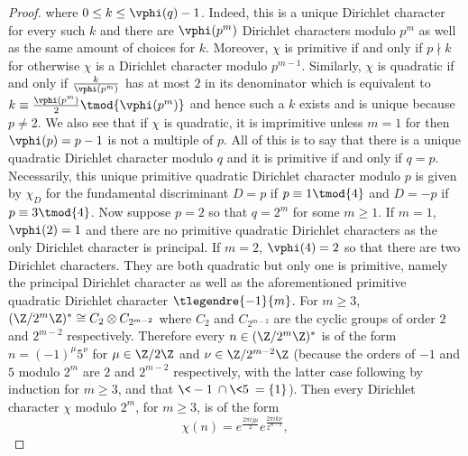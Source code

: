 \begin{proof}
        where $0 \le k \le \vphi(q)-1$. Indeed, this is a unique Dirichlet character for every such $k$ and there are $\vphi(p^{m})$ Dirichlet characters modulo $p^{m}$ as well as the same amount of choices for $k$. Moreover, $\chi$ is primitive if and only if $p \nmid k$ for otherwise $\chi$ is a Dirichlet character modulo $p^{m-1}$. Similarly, $\chi$ is quadratic if and only if $\frac{k}{\vphi(p^{m})}$ has at most $2$ in its denominator which is equivalent to $k \equiv \frac{\vphi(p^{m})}{2} \tmod{\vphi(p^{m})}$ and hence such a $k$ exists and is unique because $p \neq 2$. We also see that if $\chi$ is quadratic, it is imprimitive unless $m = 1$ for then $\vphi(p) = p-1$ is not a multiple of $p$. All of this is to say that there is a unique quadratic Dirichlet character modulo $q$ and it is primitive if and only if $q = p$. Necessarily, this unique primitive quadratic Dirichlet character modulo $p$ is given by $\chi_{D}$ for the fundamental discriminant $D = p$ if $p \equiv 1 \tmod{4}$ and $D = -p$ if $p \equiv 3 \tmod{4}$. Now suppose $p = 2$ so that $q = 2^{m}$ for some $m \ge 1$. If $m = 1$, $\vphi(2) = 1$ and there are no primitive quadratic Dirichlet characters as the only Dirichlet character is principal. If $m = 2$, $\vphi(4) = 2$ so that there are two Dirichlet characters. They are both quadratic but only one is primitive, namely the principal Dirichlet character as well as the aforementioned primitive quadratic Dirichlet character $\tlegendre{-1}{m}$. For $m \ge 3$, $(\Z/2^{m}\Z)^{\ast} \cong C_{2} \otimes C_{2^{m-2}}$ where $C_{2}$ and $C_{2^{m-2}}$ are the cyclic groups of order $2$ and $2^{m-2}$ respectively. Therefore every $n \in (\Z/2^{m}\Z)^{\ast}$ is of the form $n = (-1)^{\mu}5^{\nu}$ for $\mu \in \Z/2\Z$ and $\nu \in \Z/2^{m-2}\Z$ (because the orders of $-1$ and $5$ modulo $2^{m}$ are $2$ and $2^{m-2}$ respectively, with the latter case following by induction for $m \ge 3$, and that $\<-1\> \cap \<5\> = \{1\}$). Then every Dirichlet character $\chi$ modulo $2^{m}$, for $m \ge 3$, is of the form
        \[
          \chi(n) = e^{\frac{2\pi ij\mu}{2}}e^{\frac{2\pi ik\nu}{2^{m-2}}},
        \]

\end{proof}
